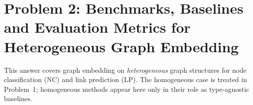 \newcommand{\pTwoTgt}{orange!22}
\newcommand{\pTwoAgt}{blue!12}
\newcommand{\pTwoAtt}{green!14}
\newcommand{\pTwoVen}{purple!12}

\section*{Problem 2: Benchmarks, Baselines and Evaluation Metrics for
Heterogeneous Graph Embedding}

\noindent
This answer covers graph embedding on \emph{heterogeneous} graph structures for node
classification (NC) and link prediction (LP). The homogeneous case is treated in Problem~1;
homogeneous methods appear here only in their role as type-agnostic baselines.

